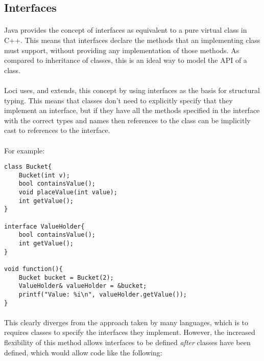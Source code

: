 \documentclass[12pt,twoside,notitlepage]{report}
\begin{document}
\subsection{Interfaces}

\paragraph{}
Java provides the concept of interfaces as equivalent to a pure virtual class in C++. This means that interfaces declare the methods that an implementing class must support, without providing any implementation of those methods. As compared to inheritance of classes, this is an ideal way to model the API of a class.

\paragraph{}
Loci uses, and extends, this concept by using interfaces as the basis for structural typing. This means that classes don't need to explicitly specify that they implement an interface, but if they have all the methods specified in the interface with the correct types and names then references to the class can be implicitly cast to references to the interface.

\paragraph{}
For example:

\small{
\begin{verbatim}
class Bucket{
    Bucket(int v);
    bool containsValue();
    void placeValue(int value);
    int getValue();
}

interface ValueHolder{
    bool containsValue();
    int getValue();
}

void function(){
    Bucket bucket = Bucket(2);
    ValueHolder& valueHolder = &bucket;
    printf("Value: %i\n", valueHolder.getValue());
}
\end{verbatim}
}

\paragraph{}
This clearly diverges from the approach taken by many languages, which is to requires classes to specify the interfaces they implement. However, the increased flexibility of this method allows interfaces to be defined \emph{after} classes have been defined, which would allow code like the following:
\end{document}

